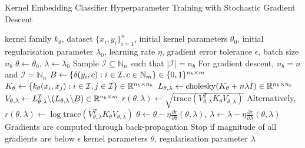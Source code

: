 \documentclass{article}
\begin{document}
	\begin{algorithm}[tb]
		\caption{Kernel Embedding Classifier Hyperparameter Training with Stochastic Gradient Descent}
		\label{alg:training_stochastic_gradient_descent}
		\begin{algorithmic}[1]
			 kernel family $k_{\theta}$, dataset $\{x_{i}, y_{i}\}_{i = 1}^{n}$, initial kernel parameters $\theta_{0}$, initial regularisation parameter $\lambda_{0}$, learning rate $\eta$, gradient error tolerance $\epsilon$, batch size $n_{b}$
			\STATE $\theta \leftarrow \theta_{0}$, $\lambda \leftarrow \lambda_{0}$
			\REPEAT
			\STATE Sample $\mathcal{I} \subseteq \mathbb{N}_{n}$ such that $| \mathcal{I} | = n_{b}$ \hspace{\fill} For gradient descent, $n_{b} = n$ and $\mathcal{I} = \mathbb{N}_{n}$
			\STATE $B \leftarrow \{\delta(y_{i}, c) : i \in \mathcal{I}, c \in \mathbb{N}_{m}\} \hspace{\fill} \in \{0, 1\}^{n_{b} \times m}$
			\STATE $K_{\theta} \leftarrow \{k_{\theta}(x_{i}, x_{j}) : i \in \mathcal{I}, j \in \mathcal{I}\} \hspace{\fill} \in \mathbb{R}^{n_{b} \times n_{b}}$
			\STATE $L_{\theta, \lambda} \leftarrow \mathrm{cholesky}(K_{\theta} + n \lambda I) \hspace{\fill} \in \mathbb{R}^{n_{b} \times n_{b}}$
			\STATE $V_{\theta, \lambda} \leftarrow L_{\theta, \lambda}^{T} \backslash (L_{\theta, \lambda} \backslash B) \hspace{\fill} \in \mathbb{R}^{n_{b} \times m}$
			\STATE $r(\theta, \lambda) \leftarrow \sqrt{\mathrm{trace}(V_{\theta, \lambda}^{T} K_{\theta} V_{\theta, \lambda})}$ \hspace{\fill} Alternatively, $r(\theta, \lambda) \leftarrow \log{\mathrm{trace}(V_{\theta, \lambda}^{T} K_{\theta} V_{\theta, \lambda})}$
			\STATE $\theta \leftarrow \theta - \eta \frac{\partial r}{\partial \theta}(\theta, \lambda)$, $\lambda \leftarrow \lambda - \eta \frac{\partial r}{\partial \lambda}(\theta, \lambda)$ \hspace{\fill} Gradients are computed through back-propagation
			 \hspace{\fill} Stop if magnitude of all gradients are below $\epsilon$
			 kernel parameters $\theta$, regularisation parameter $\lambda$
		\end{algorithmic}
	\end{algorithm}
	
\end{document}
